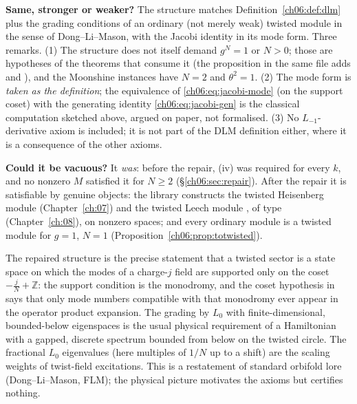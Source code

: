 \begin{dictionary}
\textbf{Same, stronger or weaker?}  The structure matches Definition~\ref{ch06:def:dlm} plus the
grading conditions of an ordinary (not merely weak) twisted module in the sense of
Dong--Li--Mason, with the Jacobi identity in its mode form.  Three remarks.  (1) The structure does
not itself demand $g^N=1$ or $N>0$; those are hypotheses of the theorems that consume it (the
proposition  in the same file adds  and ), and
the Moonshine instances have $N=2$ and $\theta^2=1$.  (2) The mode form is \emph{taken as the
definition}; the equivalence of \eqref{ch06:eq:jacobi-mode} (on the support coset) with the
generating identity \eqref{ch06:eq:jacobi-gen} is the classical computation sketched above, argued
on paper, not formalised.  (3) No $L_{-1}$-derivative axiom is included; it is not part of the DLM
definition either, where it is a consequence of the other axioms.

\textbf{Could it be vacuous?}  It \emph{was}: before the repair, (iv) was required for every $k$,
and no nonzero $M$ satisfied it for $N\ge2$ (\S\ref{ch06:sec:repair}).  After the repair it is
satisfiable by genuine objects: the library constructs the twisted Heisenberg module
 (Chapter~\ref{ch:07})
and the twisted Leech module , of type
 (Chapter~\ref{ch:08}), on
nonzero spaces; and every ordinary module is a twisted module for $g=1$, $N=1$
(Proposition~\ref{ch06:prop:totwisted}).
\end{dictionary}

\begin{physics}
The repaired structure is the precise statement that a twisted sector is a state space on which the modes of a charge-$j$ field are supported only on the coset $-\tfrac jN+\mathbb Z$: the support condition is the monodromy, and the coset hypothesis in  says that only mode numbers compatible with that monodromy ever appear in the operator product expansion. The grading by $L_0$ with finite-dimensional, bounded-below eigenspaces is the usual physical requirement of a Hamiltonian with a gapped, discrete spectrum bounded from below on the twisted circle. The fractional $L_0$ eigenvalues (here multiples of $1/N$ up to a shift) are the scaling weights of twist-field excitations. This is a restatement of standard orbifold lore (Dong--Li--Mason, FLM); the physical picture motivates the axioms but certifies nothing.
\end{physics}


